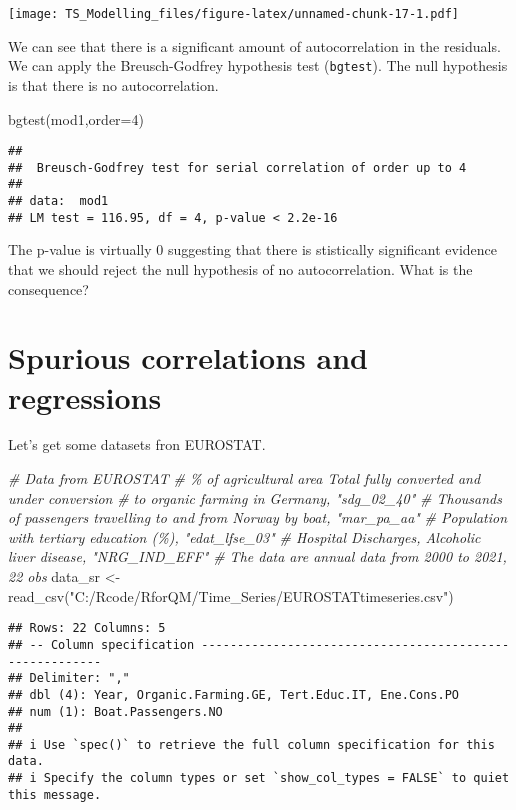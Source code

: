 \documentclass[
]{article}
\newenvironment{Shaded}{\begin{snugshade}}{\end{snugshade}}
\newcommand{\AttributeTok}[1]{\textcolor[rgb]{0.77,0.63,0.00}{#1}}
\newcommand{\CommentTok}[1]{\textcolor[rgb]{0.56,0.35,0.01}{\textit{#1}}}
\newcommand{\DecValTok}[1]{\textcolor[rgb]{0.00,0.00,0.81}{#1}}
\newcommand{\FunctionTok}[1]{\textcolor[rgb]{0.00,0.00,0.00}{#1}}
\newcommand{\NormalTok}[1]{#1}
\newcommand{\OtherTok}[1]{\textcolor[rgb]{0.56,0.35,0.01}{#1}}
\newcommand{\StringTok}[1]{\textcolor[rgb]{0.31,0.60,0.02}{#1}}
\begin{document}
\texttt{[image: TS\_Modelling\_files/figure-latex/unnamed-chunk-17-1.pdf]}

We can see that there is a significant amount of autocorrelation in the
residuals. We can apply the Breusch-Godfrey hypothesis test
(\texttt{bgtest}). The null hypothesis is that there is no
autocorrelation.

\begin{Shaded}
\begin{Highlighting}[]
\FunctionTok{bgtest}\NormalTok{(mod1,}\AttributeTok{order=}\DecValTok{4}\NormalTok{)}
\end{Highlighting}
\end{Shaded}

\begin{verbatim}
## 
##  Breusch-Godfrey test for serial correlation of order up to 4
## 
## data:  mod1
## LM test = 116.95, df = 4, p-value < 2.2e-16
\end{verbatim}

The p-value is virtually 0 suggesting that there is stistically
significant evidence that we should reject the null hypothesis of no
autocorrelation. What is the consequence?

\hypertarget{spurious-correlations-and-regressions}{%
\section{Spurious correlations and
regressions}\label{spurious-correlations-and-regressions}}

Let's get some datasets fron EUROSTAT.

\begin{Shaded}
\begin{Highlighting}[]
\CommentTok{\# Data from EUROSTAT}
\CommentTok{\# \% of agricultural area Total fully converted and under conversion }
\CommentTok{\# to organic farming in Germany, "sdg\_02\_40"}
\CommentTok{\# Thousands of passengers travelling to and from Norway by boat, "mar\_pa\_aa"}
\CommentTok{\# Population with tertiary education (\%), "edat\_lfse\_03"}
\CommentTok{\# Hospital Discharges, Alcoholic liver disease, "NRG\_IND\_EFF"}
\CommentTok{\# The data are annual data from 2000 to 2021, 22 obs}
\NormalTok{data\_sr }\OtherTok{\textless{}{-}} \FunctionTok{read\_csv}\NormalTok{(}\StringTok{"C:/Rcode/RforQM/Time\_Series/EUROSTATtimeseries.csv"}\NormalTok{)}
\end{Highlighting}
\end{Shaded}

\begin{verbatim}
## Rows: 22 Columns: 5
## -- Column specification --------------------------------------------------------
## Delimiter: ","
## dbl (4): Year, Organic.Farming.GE, Tert.Educ.IT, Ene.Cons.PO
## num (1): Boat.Passengers.NO
## 
## i Use `spec()` to retrieve the full column specification for this data.
## i Specify the column types or set `show_col_types = FALSE` to quiet this message.
\end{verbatim}
\end{document}
